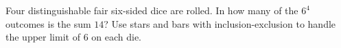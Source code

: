 Four distinguishable fair six-sided dice are rolled. In how many of the $6^4$ outcomes is the sum $14$? Use stars and bars with inclusion-exclusion to handle the upper limit of $6$ on each die.
